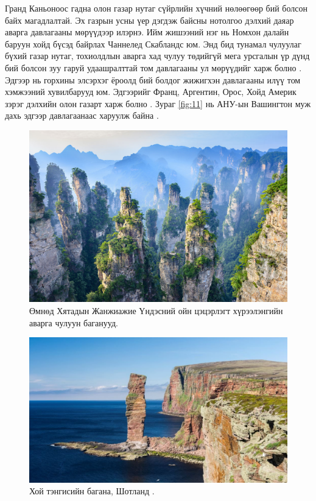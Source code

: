 \documentclass[10pt,twocolumn,letterpaper]{article}
\begin{document}
Гранд Каньоноос гадна олон газар нутаг сүйрлийн хүчний нөлөөгөөр бий болсон байх магадлалтай. Эх газрын усны үер дэгдэж байсны нотолгоо дэлхий даяар аварга давлагааны мөрүүдээр илэрнэ. Ийм жишээний нэг нь Номхон далайн баруун хойд бүсэд байрлах Чаннелед Скабландс юм. Энд бид тунамал чулуулаг бүхий газар нутаг, тохиолдлын аварга хад чулуу төдийгүй мега урсгалын үр дүнд бий болсон зуу гаруй удаашралттай том давлагааны ул мөрүүдийг харж болно \cite{78,79}. Эдгээр нь горхины элсэрхэг ёроолд бий болдог жижигхэн давлагааны илүү том хэмжээний хувилбарууд юм. Эдгээрийг Франц, Аргентин, Орос, Хойд Америк зэрэг дэлхийн олон газарт харж болно \cite{81}. Зураг \ref{fig:11} нь АНУ-ын Вашингтон муж дахь эдгээр давлагаанаас харуулж байна \cite{80}.

\begin{figure}[b]
\begin{center}
   \includegraphics[width=1\linewidth]{zhangjiajie.jpg}
\end{center}
   \caption{Өмнөд Хятадын Жанжиажие Үндэсний ойн цэцэрлэгт хүрээлэнгийн аварга чулуун баганууд.}
\label{fig:12}
\label{fig:onecol}
\end{figure}

\begin{figure}[b]
\begin{center}
\includegraphics[width=1\linewidth]{hoy.jpg}
\end{center}
   \caption{Хой тэнгисийн багана, Шотланд \cite{83}.}
\label{fig:13}
\label{fig:onecol}
\end{figure}
\end{document}
